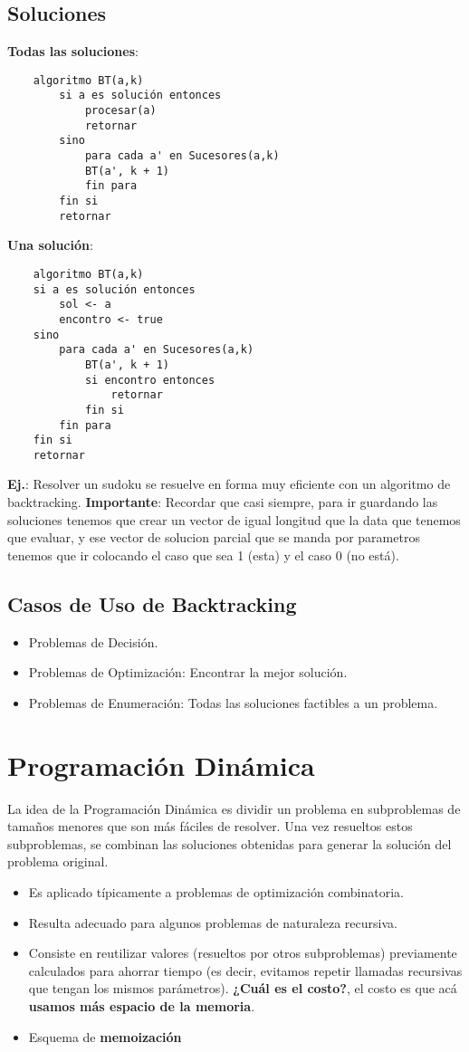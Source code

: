 \documentclass[10pt,a4paper]{article}
\begin{document}
\subsection*{Soluciones}
\textbf{Todas las soluciones}:
\begin{lstlisting}
    algoritmo BT(a,k)
        si a es solución entonces
            procesar(a)
            retornar
        sino
            para cada a' en Sucesores(a,k)
            BT(a', k + 1)
            fin para
        fin si
        retornar
\end{lstlisting}
\textbf{Una solución}:
\begin{lstlisting}
    algoritmo BT(a,k)
    si a es solución entonces
        sol <- a
        encontro <- true
    sino
        para cada a' en Sucesores(a,k)
            BT(a', k + 1)
            si encontro entonces
                retornar
            fin si
        fin para
    fin si
    retornar
\end{lstlisting}
\textbf{Ej.}: Resolver un sudoku se resuelve en forma muy eficiente con un algoritmo de backtracking.
\textbf{Importante}: Recordar que casi siempre, para ir guardando las soluciones tenemos que crear un vector de igual longitud que la data que tenemos que evaluar, y ese vector de solucion parcial que se manda por parametros tenemos que ir colocando el caso que sea 1 (esta) y el caso 0 (no está).
\subsection*{Casos de Uso de Backtracking}
\begin{itemize}
    \item Problemas de Decisión.
    \item Problemas de Optimización: Encontrar la mejor solución.
    \item Problemas de Enumeración: Todas las soluciones factibles a un problema.
\end{itemize}
\section*{Programación Dinámica}
La idea de la Programación Dinámica es dividir un problema en subproblemas de tamaños menores que son más fáciles de resolver. Una vez resueltos estos subproblemas, se combinan las soluciones obtenidas para generar la solución del problema original.
\begin{itemize}
    \item Es aplicado típicamente a problemas de optimización combinatoria.
    \item Resulta adecuado para algunos problemas de naturaleza recursiva.
    \item Consiste en reutilizar valores (resueltos por otros subproblemas) previamente calculados para ahorrar tiempo (es decir, evitamos repetir llamadas recursivas que tengan los mismos parámetros). \textbf{¿Cuál es el costo?}, el costo es que acá \textbf{usamos más espacio de la memoria}.
    \item Esquema de \textbf{memoización}
\end{itemize}
\end{document}
